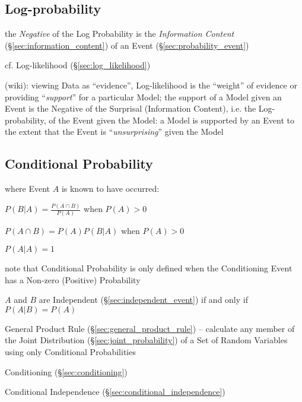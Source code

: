 \subsection{Log-probability}\label{sec:log_probability}

the \emph{Negative} of the Log Probability is the \emph{Information Content}
(\S\ref{sec:information_content}) of an Event (\S\ref{sec:probability_event})

cf. Log-likelihood (\S\ref{sec:log_likelihood})

(wiki): viewing Data as ``evidence'', Log-likelihood is the ``weight'' of
evidence or providing ``\emph{support}'' for a particular Model; the support of
a Model given an Event is the Negative of the Surprisal (Information Content),
i.e. the Log-probability, of the Event given the Model: a Model is supported by
an Event to the extent that the Event is ``\emph{unsurprising}'' given the Model



\subsection{Conditional Probability}\label{sec:conditional_probability}

where Event $A$ is known to have occurred:

$P(B|A) = \frac{P(A \cap B)}{P(A)}$ when $P(A) > 0$

$P(A \cap B) = P(A) P(B|A)$ when $P(A) > 0$

$P(A|A) = 1$

note that Conditional Probability is only defined when the Conditioning Event
has a Non-zero (Positive) Probability

$A$ and $B$ are Independent (\S\ref{sec:independent_event}) if and only if
$P(A|B) = P(A)$

General Product Rule (\S\ref{sec:general_product_rule}) -- calculate any member
of the Joint Distribution (\S\ref{sec:joint_probability}) of a Set of Random
Variables using only Conditional Probabilities

\fist Conditioning (\S\ref{sec:conditioning})

\fist Conditional Independence (\S\ref{sec:conditional_independence})

